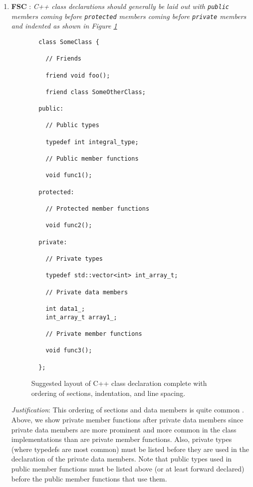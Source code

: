 \begin{enumerate}
{}\item{}\textbf{FSC }:
{}\textit{C++ class declarations should generally be laid out with
{}\texttt{public} members coming before {}\texttt{protected} members coming
before {}\texttt{private} members and indented as shown in Figure
{}\ref{fig:class_decl_layout}}

\begin{figure}
%
{\small\begin{verbatim}
  class SomeClass {

    // Friends

    friend void foo();

    friend class SomeOtherClass;

  public:

    // Public types

    typedef int integral_type;

    // Public member functions

    void func1();

  protected:

    // Protected member functions

    void func2();

  private:

    // Private types

    typedef std::vector<int> int_array_t;

    // Private data members

    int data1_;
    int_array_t array1_;

    // Private member functions

    void func3();

  };
\end{verbatim}}
%
\caption{\label{fig:class_decl_layout}
Suggested layout of C++ class declaration complete with ordering of sections,
indentation, and line spacing.}
%
\end{figure}

{}\textit{Justification}: This ordering of sections and data members is quite
common {}\cite[Section 31.8]{CodeComplete2nd04}.  Above, we show private
member functions after private data members since private data members are
more prominent and more common in the class implementations than are private
member functions.  Also, private types (where typedefs are most common) must
be listed before they are used in the declaration of the private data members.
Note that public types used in public member functions must be listed above
(or at least forward declared) before the public member functions that use
them.


\end{enumerate}
